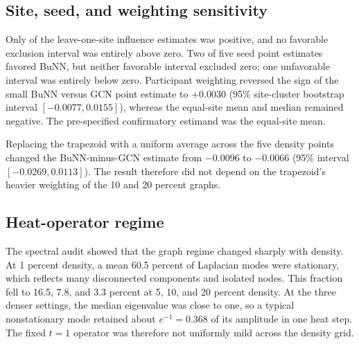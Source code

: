 \documentclass[11pt,a4paper]{article}
\begin{document}
\subsection{Site, seed, and weighting sensitivity}

Only \LeaveOneSitePositive{} of the \StudySites{} leave-one-site influence
estimates was positive, and no favorable exclusion interval was entirely above
zero. Two of five seed point estimates favored BuNN, but neither favorable
interval excluded zero; one unfavorable interval was entirely below zero.
Participant weighting reversed the sign of the small BuNN versus GCN point
estimate to $+0.0030$ (95\% site-cluster bootstrap interval
$[-0.0077,0.0155]$), whereas the equal-site mean and median remained negative.
The pre-specified confirmatory estimand was the equal-site mean.



\begin{table}[htbp]
\centering
\caption{Post-hoc model summaries under equal-site and participant weighting.
Intervals resample held-out sites as clusters.}
\label{tab:model-weighting-ci}
\small

\end{table}

\begin{table}[htbp]
\centering
\caption{Post-hoc weighting sensitivity for the main practical contrasts.}
\label{tab:weighting-contrasts}
\small

\end{table}

Replacing the trapezoid with a uniform average across the five density points
changed the BuNN-minus-GCN estimate from $-0.0096$ to $-0.0066$ (95\%
interval $[-0.0269,0.0113]$). The result therefore did not depend on the
trapezoid's heavier weighting of the 10 and 20 percent graphs.

\subsection{Heat-operator regime}

The spectral audit showed that the graph regime changed sharply with density.
At 1 percent density, a mean 60.5 percent of Laplacian modes were stationary,
which reflects many disconnected components and isolated nodes. This fraction
fell to 16.5, 7.8, and 3.3 percent at 5, 10, and 20 percent density. At the
three denser settings, the median eigenvalue was close to one, so a typical
nonstationary mode retained about $e^{-1}=0.368$ of its amplitude in one heat
step. The fixed $t=1$ operator was therefore not uniformly mild across the
density grid.
\end{document}
